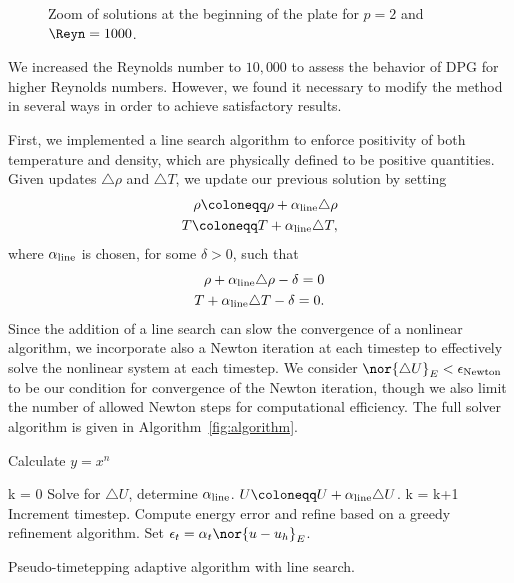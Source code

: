 \begin{figure}
\caption{Zoom of solutions at the beginning of the plate for $p=2$ and $\Reyn = 1000$.}
\label{fig:Re1000_zoom} 
\end{figure}

We increased the Reynolds number to $10,000$ to assess the behavior of DPG for higher Reynolds numbers.  However, we found it necessary to modify the method in several ways in order to achieve satisfactory results.  

First, we implemented a line search algorithm to enforce positivity of both temperature and density, which are physically defined to be positive quantities.  Given updates $\triangle \rho$ and $\triangle T$, we update our previous solution by setting 
\begin{align*}
\rho \coloneqq \rho + \alpha_{\rm line}\triangle \rho \\
T \coloneqq T + \alpha_{\rm line}\triangle T,
\end{align*}
where $\alpha_{\rm line}$ is chosen, for some $\delta > 0$, such that
\begin{align*}
\rho + \alpha_{\rm line}\triangle \rho - \delta = 0\\
T + \alpha_{\rm line}\triangle T  - \delta = 0.
\end{align*}
Since the addition of a line search can slow the convergence of a nonlinear algorithm, we incorporate also a Newton iteration at each timestep to effectively solve the nonlinear system at each timestep.  We consider $\nor{\triangle U}_E < \epsilon_{\rm Newton}$ to be our condition for convergence of the Newton iteration, though we also limit the number of allowed Newton steps for computational efficiency.  The full solver algorithm is given in Algorithm~\ref{fig:algorithm}.  
\begin{algorithm}                      %
\caption{Calculate $y = x^n$}          %
\label{alg1}                           %
\begin{algorithmic}                    %
        \STATE k = 0
            \STATE Solve for $\triangle U$, determine $\alpha_{\rm line}$.  
            \STATE $U \coloneqq U + \alpha_{\rm line}\triangle U$.  
            \STATE k = k+1
        \ENDWHILE
        \STATE Increment timestep.  
    \ENDWHILE
    \STATE Compute energy error and refine based on a greedy refinement algorithm.
    \STATE Set $\epsilon_t = \alpha_t \nor{u-u_h}_E$.    
\ENDFOR
\end{algorithmic}
\caption{Pseudo-timetepping adaptive algorithm with line search.}
\label{fig:algorithm}
\end{algorithm}
